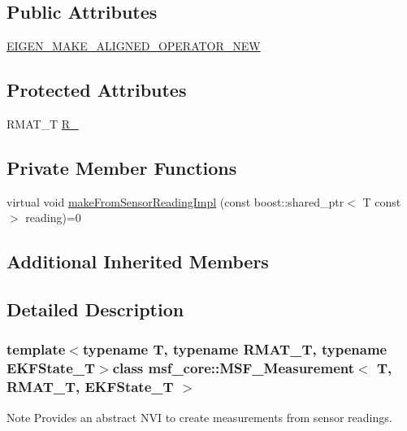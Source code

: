 \subsection*{Public Attributes}
\begin{DoxyCompactItemize}
\item 
\hyperlink{classmsf__core_1_1MSF__Measurement_a481fa3230f73f28a8489223311c3033f}{E\-I\-G\-E\-N\-\_\-\-M\-A\-K\-E\-\_\-\-A\-L\-I\-G\-N\-E\-D\-\_\-\-O\-P\-E\-R\-A\-T\-O\-R\-\_\-\-N\-E\-W}
\end{DoxyCompactItemize}
\subsection*{Protected Attributes}
\begin{DoxyCompactItemize}
\item 
R\-M\-A\-T\-\_\-\-T \hyperlink{classmsf__core_1_1MSF__Measurement_a20fcacb533df8a1e6ae4fad4a3eb06ec}{R\-\_\-}
\end{DoxyCompactItemize}
\subsection*{Private Member Functions}
\begin{DoxyCompactItemize}
\item 
virtual void \hyperlink{classmsf__core_1_1MSF__Measurement_a46f5283b196c6a7a34b9aa8ff85c8358}{make\-From\-Sensor\-Reading\-Impl} (const boost\-::shared\-\_\-ptr$<$ T const  $>$ reading)=0
\end{DoxyCompactItemize}
\subsection*{Additional Inherited Members}


\subsection{Detailed Description}
\subsubsection*{template$<$typename T, typename R\-M\-A\-T\-\_\-\-T, typename E\-K\-F\-State\-\_\-\-T$>$class msf\-\_\-core\-::\-M\-S\-F\-\_\-\-Measurement$<$ T, R\-M\-A\-T\-\_\-\-T, E\-K\-F\-State\-\_\-\-T $>$}

\begin{DoxyNote}{Note}
Provides an abstract N\-V\-I to create measurements from sensor readings. 
\end{DoxyNote}


